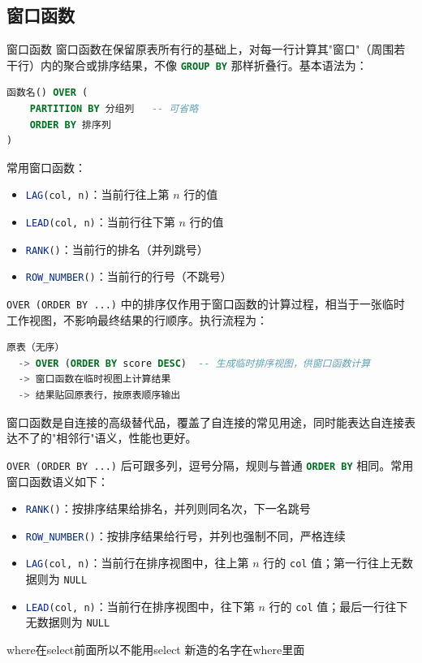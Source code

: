 \subsection{窗口函数}
\begin{definition}{窗口函数}{}
窗口函数在保留原表所有行的基础上，对每一行计算其"窗口"（周围若干行）内的聚合或排序结果，不像 \lstinline[language=SQL]|GROUP BY| 那样折叠行。基本语法为：
\begin{lstlisting}[language=SQL, backgroundcolor=\color{white}, frame=single]
函数名() OVER (
    PARTITION BY 分组列   -- 可省略
    ORDER BY 排序列
)
\end{lstlisting}
常用窗口函数：
\begin{itemize}
    \item \lstinline[language=SQL]|LAG(col, n)|：当前行往上第 $n$ 行的值
    \item \lstinline[language=SQL]|LEAD(col, n)|：当前行往下第 $n$ 行的值
    \item \lstinline[language=SQL]|RANK()|：当前行的排名（并列跳号）
    \item \lstinline[language=SQL]|ROW_NUMBER()|：当前行的行号（不跳号）
\end{itemize}
\end{definition}
\begin{note}
\texttt{OVER (ORDER BY ...)} 中的排序仅作用于窗口函数的计算过程，相当于一张临时工作视图，不影响最终结果的行顺序。执行流程为：

\begin{lstlisting}[language=SQL, backgroundcolor=\color{white}, frame=single]
原表（无序）
  -> OVER (ORDER BY score DESC)  -- 生成临时排序视图，供窗口函数计算
  -> 窗口函数在临时视图上计算结果
  -> 结果贴回原表行，按原表顺序输出
\end{lstlisting}


\end{note}
\begin{dxtips}
    窗口函数是自连接的高级替代品，覆盖了自连接的常见用途，同时能表达自连接表达不了的"相邻行"语义，性能也更好。
\end{dxtips}
\begin{note}
\texttt{OVER (ORDER BY ...)} 后可跟多列，逗号分隔，规则与普通 \lstinline[language=SQL]|ORDER BY| 相同。常用窗口函数语义如下：

\begin{itemize}
    \item \lstinline[language=SQL]|RANK()|：按排序结果给排名，并列则同名次，下一名跳号
    \item \lstinline[language=SQL]|ROW_NUMBER()|：按排序结果给行号，并列也强制不同，严格连续
    \item \lstinline[language=SQL]|LAG(col, n)|：当前行在排序视图中，往上第 $n$ 行的 \texttt{col} 值；第一行往上无数据则为 \texttt{NULL}
    \item \lstinline[language=SQL]|LEAD(col, n)|：当前行在排序视图中，往下第 $n$ 行的 \texttt{col} 值；最后一行往下无数据则为 \texttt{NULL}
\end{itemize}
\end{note}
\begin{dxtips}
    where在select前面所以不能用select 新造的名字在where里面
\end{dxtips}

